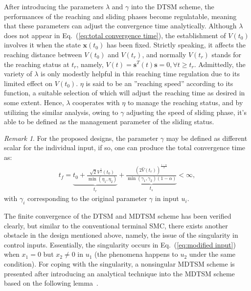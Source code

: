 \documentclass[3p]{elsarticle}
\theoremstyle{plain}
\theoremstyle{remark}
\newtheorem{myrem}{Remark}
\begin{document}
After introducing the parameters $\lambda$ and $\gamma$ into the DTSM scheme, the performances of the reaching and sliding phases become regulatable, meaning that these parameters can adjust the convergence time analytically. Although $\lambda$ does not appear in Eq.~(\ref{eq:total convergence time}), the establishment of $V(t_0)$ involves it when the state $\bm x(t_0)$ has been fixed. Strictly speaking, it affects the reaching distance between $V(t_0)$ and $V(t_r)$, and normally $V(t_r)$ stands for the reaching status at $t_r$, namely, $V(t)=\bm s^T(t)\bm s = 0,\forall t\ge t_r$. Admittedly, the variety of $\lambda$ is only modestly helpful in this reaching time regulation due to its limited effect on $V(t_0)$. $\eta$ is said to be an ''reaching speed'' according to its function, a suitable selection of which will adjust the reaching time as desired in some extent. Hence, $\lambda$ cooperates with $\eta$ to manage the reaching status, and by utilizing the similar analysis, owing to $\gamma$ adjusting the speed of sliding phase, it's able to be defined as the management parameter of the sliding status.
\begin{myrem}
For the proposed designs, the parameter $\gamma$ may be defined as different scalar for the individual input, if so, one can produce the total convergence time as:
\begin{align}
t_f = \underbrace{t_0+\frac{\sqrt{2}V^{\frac{1}{2}}(t_0)}{\min(\eta_1,\eta_2)}}_{t_r}+\underbrace{\frac{(2\hat V(t_r))^{\frac{1-\alpha}{2}}}{\min(\gamma_1,\gamma_2)(1-\alpha)}}_{t_s}<\infty,\label{eq:normal total convergence time}
\end{align}
with $\gamma_i$ corresponding to the original parameter $\gamma$ in input $u_i$.
\end{myrem}
The finite convergence of the DTSM and MDTSM scheme has been verified clearly, but similar to the conventional terminal SMC, there exists another obstacle in the design mentioned above, namely, the issue of the singularity in control inputs. Essentially, the singularity occurs in Eq.~(\ref{eq:modified input}) when $x_1=0$ but $x_2\neq 0$ in $u_1$ (the phenomena happens to $u_2$ under the same condition). For coping with the singularity, a nonsingular MDTSM scheme is presented after introducing an analytical technique into the MDTSM scheme based on the following lemma~\cite{feng2013nonsingular}.
\end{document}
